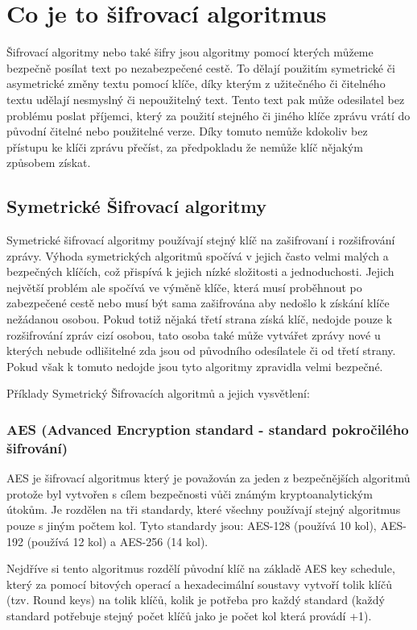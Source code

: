 \documentclass[12pt,a4paper]{report}
\begin{document}
\chapter{Co je to šifrovací algoritmus}
Šifrovací algoritmy nebo také šifry jsou algoritmy pomocí kterých můžeme bezpečně posílat text po nezabezpečené cestě. To dělají použitím symetrické či asymetrické změny textu pomocí klíče, díky kterým z užitečného či čitelného textu udělají nesmyslný či nepoužitelný text. Tento text pak může odesilatel bez problému poslat příjemci, který za použití stejného či jiného klíče zprávu vrátí do původní čitelné nebo použitelné verze. Díky tomuto nemůže kdokoliv bez přístupu ke klíči zprávu přečíst, za předpokladu že nemůže klíč nějakým způsobem získat. 

\section{Symetrické Šifrovací algoritmy}
Symetrické šifrovací algoritmy používají stejný klíč na zašifrovaní i rozšifrování zprávy. Výhoda symetrických algoritmů spočívá v jejich často velmi malých a bezpečných klíčích, což přispívá k jejich nízké složitosti a jednoduchosti. Jejich největší problém ale spočívá ve výměně klíče, která musí proběhnout po zabezpečené cestě nebo musí být sama zašifrována aby nedošlo k získání klíče nežádanou osobou. Pokud totiž nějaká třetí strana získá klíč, nedojde pouze k rozšifrování zpráv cizí osobou, tato osoba také může vytvářet zprávy nové u kterých nebude odlišitelné zda jsou od původního odesílatele či od třetí strany. Pokud však k tomuto nedojde jsou tyto algoritmy zpravidla velmi bezpečné.

Příklady Symetrický Šifrovacích algoritmů a jejich vysvětlení:

\subsection {AES (Advanced Encryption standard - standard pokročilého šifrování)}
AES je šifrovací algoritmus který je považován za jeden z bezpečnějších algoritmů protože byl vytvořen s cílem bezpečnosti vůči známým kryptoanalytickým útokům. Je rozdělen na tři standardy, které všechny používají stejný algoritmus pouze s jiným počtem kol. Tyto standardy jsou: AES-128 (používá 10 kol), AES-192 (používá 12 kol) a AES-256 (14 kol).

Nejdříve si tento algoritmus rozdělí původní klíč na základě AES key schedule, který za pomocí bitových operací a hexadecimální soustavy vytvoří tolik klíčů (tzv. Round keys) na tolik klíčů, kolik je potřeba pro každý standard (každý standard potřebuje stejný počet klíčů jako je počet kol která provádí +1).
\end{document}
